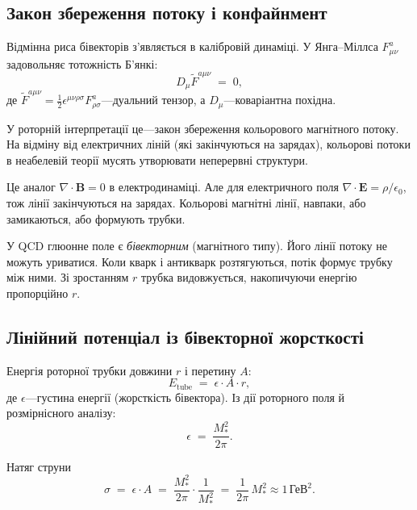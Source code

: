 \documentclass[11pt,a4paper]{article}
\theoremstyle{definition}
\theoremstyle{plain}
\theoremstyle{remark}
\begin{document}
\subsection{Закон збереження потоку і конфайнмент}

Відмінна риса бівекторів з’являється в калібровій динаміці. У Янга–Міллса $F_{\mu\nu}^a$ задовольняє тотожність Б’янкі:
\begin{equation}
D_\mu \tilde{F}^{a\mu\nu} \;=\; 0,
\label{eq:bianchi-identity}
\end{equation}
де $\tilde{F}^{a\mu\nu}=\frac{1}{2}\epsilon^{\mu\nu\rho\sigma}F_{\rho\sigma}^a$—дуальний тензор, а $D_\mu$—коваріантна похідна.

У роторній інтерпретації це—закон збереження кольорового магнітного потоку. На відміну від електричних ліній (які закінчуються на зарядах), кольорові потоки в неабелевій теорії мусять утворювати неперервні структури.

Це аналог $\nabla\cdot\mathbf{B}=0$ в електродинаміці. Але для електричного поля $\nabla\cdot\mathbf{E}=\rho/\epsilon_0$, тож лінії закінчуються на зарядах. Кольорові магнітні лінії, навпаки, або замикаються, або формують трубки.

У QCD глюонне поле є \emph{бівекторним} (магнітного типу). Його лінії потоку не можуть уриватися. Коли кварк і антикварк розтягуються, потік формує трубку між ними. Зі зростанням $r$ трубка видовжується, накопичуючи енергію пропорційно $r$.

\subsection{Лінійний потенціал із бівекторної жорсткості}

Енергія роторної трубки довжини $r$ і перетину $A$:
\begin{equation}
E_{\mathrm{tube}} \;=\; \epsilon \cdot A \cdot r,
\label{eq:tube-energy}
\end{equation}
де $\epsilon$—густина енергії (жорсткість бівектора). Із дії роторного поля й розмірнісного аналізу:
\begin{equation}
\epsilon \;=\; \frac{M_\ast^2}{2\pi}.
\end{equation}

Натяг струни
\begin{equation}
\sigma \;=\; \epsilon \cdot A \;=\; \frac{M_\ast^2}{2\pi}\cdot\frac{1}{M_\ast^2} \;=\; \frac{1}{2\pi}\,M_\ast^2 \approx 1\,\text{ГеВ}^2.
\end{equation}
\end{document}
